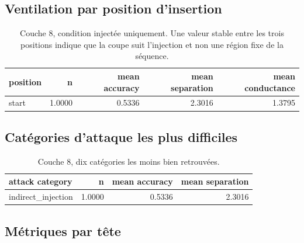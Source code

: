 \documentclass[11pt,a4paper]{article}
\begin{document}
\subsection{Ventilation par position d'insertion}

\begin{table}[htbp]
\centering
\small
\begin{tabular}{lrrrr}
\hline
position & n & mean accuracy & mean separation & mean conductance \\
\hline
start & 1.0000 & 0.5336 & 2.3016 & 1.3795 \\
\hline
\end{tabular}
\caption{Couche 8, condition injectée uniquement. Une valeur stable entre les trois positions indique que la coupe suit l'injection et non une région fixe de la séquence.}
\label{tab:positions}
\end{table}

\subsection{Catégories d'attaque les plus difficiles}

\begin{table}[htbp]
\centering
\small
\begin{tabular}{lrrr}
\hline
attack category & n & mean accuracy & mean separation \\
\hline
indirect\_injection & 1.0000 & 0.5336 & 2.3016 \\
\hline
\end{tabular}
\caption{Couche 8, dix catégories les moins bien retrouvées.}
\label{tab:categories}
\end{table}

\subsection{Métriques par tête}
\end{document}
